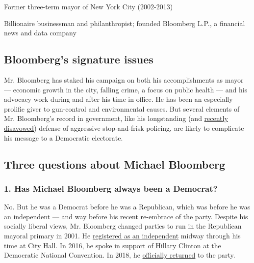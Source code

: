 Former three-term mayor of New York City (2002-2013)

Billionaire businessman and philanthropist; founded Bloomberg L.P., a
financial news and data company

\hypertarget{bloombergs-signature-issues}{%
\subsection{Bloomberg's signature
issues}\label{bloombergs-signature-issues}}

Mr. Bloomberg has staked his campaign on both his accomplishments as
mayor --- economic growth in the city, falling crime, a focus on public
health --- and his advocacy work during and after his time in office. He
has been an especially prolific giver to gun-control and environmental
causes. But several elements of Mr. Bloomberg's record in government,
like his longstanding (and
\href{https://www.nytimes3xbfgragh.onion/2019/11/17/us/politics/michael-bloomberg-speech.html}{recently
disavowed}) defense of aggressive stop-and-frisk policing, are likely to
complicate his message to a Democratic electorate.

\hypertarget{three-questions-about-michael-bloomberg}{%
\subsection{Three questions about Michael
Bloomberg}\label{three-questions-about-michael-bloomberg}}

\hypertarget{1-has-michael-bloomberg-always-been-a-democrat}{%
\subsubsection{\texorpdfstring{\textbf{1. Has Michael Bloomberg always
been a
Democrat?}}{1. Has Michael Bloomberg always been a Democrat?}}\label{1-has-michael-bloomberg-always-been-a-democrat}}

No. But he was a Democrat before he was a Republican, which was before
he was an independent --- and way before his recent re-embrace of the
party. Despite his socially liberal views, Mr. Bloomberg changed parties
to run in the Republican mayoral primary in 2001. He
\href{https://cityroom.blogs.nytimes3xbfgragh.onion/2007/06/19/bloomberg-leaving-republican-party/}{registered
as an independent} midway through his time at City Hall. In 2016, he
spoke in support of Hillary Clinton at the Democratic National
Convention. In 2018, he
\href{https://www.nytimes3xbfgragh.onion/2018/10/10/nyregion/michael-bloomberg-democrat-president.html}{officially
returned} to the party.


